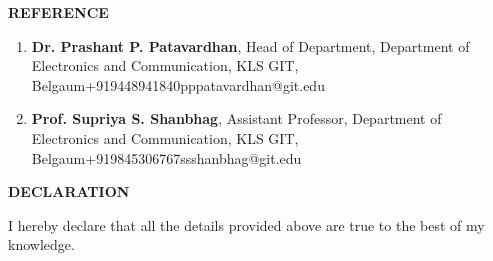 \documentclass[a4paper]{article}
\begin{document}
	\begin{flushleft}
		\vspace{5mm}
		\large{\textbf{REFERENCE}} 
		\vspace{0.5mm}
		\noindent\hrulefill
		\vspace{0.5mm}
	\end{flushleft}
	\begin{enumerate}
		\item   \textbf{Dr. Prashant P. Patavardhan}, Head of Department, Department of Electronics and Communication, KLS GIT, Belgaum\textbar +919448941840\textbar pppatavardhan@git.edu
		\item   \textbf{Prof. Supriya S. Shanbhag}, Assistant Professor, Department of Electronics and Communication, KLS GIT, Belgaum\textbar+919845306767\textbar ssshanbhag@git.edu     
	\end{enumerate}

	\begin{flushleft}
		\vspace{5mm}
		\large{\textbf{DECLARATION}} 
		\vspace{0.5mm}
		\noindent\hrulefill
		\vspace{0.5mm}
	\end{flushleft}
	I hereby declare that all the details provided above are true to the best of my knowledge.
	
\end{document}
